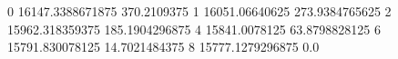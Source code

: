 0 16147.3388671875 370.2109375
1 16051.06640625 273.9384765625
2 15962.318359375 185.1904296875
4 15841.0078125 63.8798828125
6 15791.830078125 14.7021484375
8 15777.1279296875 0.0
